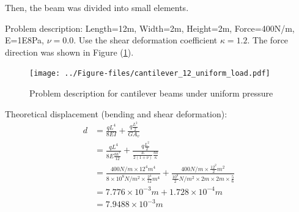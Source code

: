 \documentclass[fleqn,11pt]{article}
\begin{document}

\newpage
Then, the beam was divided into small elements. 

Problem description: Length=12m, Width=2m, Height=2m, Force=400N/m, E=1E8Pa, $\nu=0.0$. Use the shear deformation coefficient $\kappa=1.2$. The force direction was shown in Figure (\ref{fig Problem description for cantilever beams under uniform pressure 27}). 

\begin{figure}[H]
  \centering
  \texttt{[image: ../Figure-files/cantilever\_12\_uniform\_load.pdf]}
  \caption{Problem description for cantilever beams under uniform pressure  }
  \label{fig Problem description for cantilever beams under uniform pressure 27}
\end{figure}


Theoretical displacement (bending and shear deformation):
\begin{equation}
  \begin{aligned}
  d &=\frac{qL^4}{8EI} + \frac{q \frac{L^2}{2}}{GA_v} \\ 
    &=\frac{qL^4}{8E\frac{bh^3}{12} }+\frac{q \frac{L^2}{2}}{\frac{E}{2(1+\nu)}\frac{bh}{\kappa}} \\
    &= \frac{400 N/m \times 12^4 m^4}{8\times 10^8 N/m^2 \times \frac{2^4}{12} m^4} 
       + \frac{400 N/m \times \frac{12^2}{2} m^2} {\frac{10^8}{2} N/m^2 \times 2m\times 2m\times \frac{5}{6}} \\ 
    &=7.776\times 10^{-3} m  +1.728\times 10^{-4} m \\
    &=7.9488\times 10^{-3} m
   \end{aligned}
\end{equation}
\end{document}

